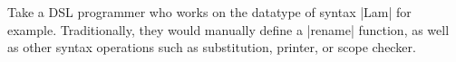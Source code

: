 \documentclass[sigplan,review,fleqn]{acmart}
\renewcommand{\verb}{\collectverb{\color{AgdaFunction}}}
\begin{document}
Take a DSL programmer who works on the datatype of syntax \verb|Lam| for example.
Traditionally, they would manually define a \verb|rename| function, as well as other syntax operations such as substitution, printer, or scope checker.
\begin{code}
	\>[0]\AgdaSpace{}%
	\AgdaSpace{}%
	\AgdaSymbol{:}\AgdaSpace{}%
	\AgdaSpace{}%
	\AgdaSpace{}%
	\AgdaSpace{}%
	\AgdaSpace{}%
	\AgdaSpace{}%
	\AgdaSpace{}%
	\<%
	\\
	\>[0][@{}l@{\AgdaIndent{0}}]%
	\>[2]\AgdaSpace{}%
	\AgdaSymbol{:}\AgdaSpace{}%
	\AgdaSpace{}%
	\AgdaSymbol{\{}\AgdaSpace{}%
	\AgdaSymbol{\}}%
	\>[19]\AgdaSpace{}%
	\AgdaSpace{}%
	\AgdaSpace{}%
	\AgdaSpace{}%
	\AgdaSpace{}%
	\AgdaSpace{}%
	\AgdaSpace{}%
	\<%
	\\
	\>[2]\AgdaSpace{}%
	\AgdaSymbol{:}\AgdaSpace{}%
	\AgdaSpace{}%
	\AgdaSymbol{\{}\AgdaSpace{}%
	\AgdaSpace{}%
	\AgdaSymbol{\}}\AgdaSpace{}%
	\AgdaSpace{}%
	\AgdaSpace{}%
	\AgdaSymbol{(}\AgdaSpace{}%
	\AgdaSpace{}%
	\AgdaSymbol{)}\AgdaSpace{}%
	\AgdaSpace{}%
	\AgdaSpace{}%
	\AgdaSpace{}%
	\AgdaSpace{}%
	\AgdaSpace{}%
	\AgdaSpace{}%
	\AgdaSpace{}%
	\AgdaSpace{}%
	\<%
	\\
	\>[2]\AgdaSpace{}%
	\AgdaSymbol{:}\AgdaSpace{}%
	\AgdaSpace{}%
	\AgdaSymbol{\{}\AgdaSpace{}%
	\AgdaSpace{}%
	\AgdaSymbol{\}}\AgdaSpace{}%
	\AgdaSpace{}%
	\AgdaSpace{}%
	\AgdaSpace{}%
	\AgdaSymbol{(}\AgdaSpace{}%
	\AgdaSpace{}%
	\AgdaSymbol{)}%
	\>[36]\AgdaSpace{}%
	\AgdaSpace{}%
	\AgdaSymbol{(}\AgdaSpace{}%
	\AgdaSpace{}%
	\AgdaSymbol{)}\AgdaSpace{}%
	\<%
	\\
	\\[\AgdaEmptyExtraSkip]%

\end{code}
\end{document}
